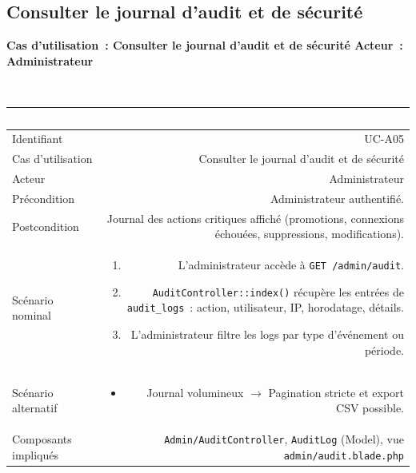 \documentclass[a4paper,12pt]{article}
\newcommand{\ucheader}[2]{%
  \noindent\colorbox{capblue}{\parbox{\dimexpr\linewidth-2\fboxsep}{%
    \color{white}\bfseries\large Cas d'utilisation~: #1 \hfill \normalsize Acteur~: #2
  }}\\[2pt]
}
\begin{document}
\vspace{1em}

\subsection{Consulter le journal d'audit et de sécurité}
\ucheader{Consulter le journal d'audit et de sécurité}{Administrateur}

\noindent
\begin{tabular}{|L|R|}
\hline
{}\textcolor{white}{\textbf{Champ}} & \textcolor{white}{\textbf{Description}} \\
\hline
{}Identifiant & UC-A05 \\
\hline
Cas d'utilisation & Consulter le journal d'audit et de sécurité \\
\hline
{}Acteur & Administrateur \\
\hline
Précondition & Administrateur authentifié. \\
\hline
{}Postcondition & Journal des actions critiques affiché (promotions, connexions échouées, suppressions, modifications). \\
\hline
Scénario nominal &
\begin{enumerate}
  \item L'administrateur accède à \texttt{GET /admin/audit}.
  \item \texttt{AuditController::index()} récupère les entrées de \texttt{audit\_logs}~: action, utilisateur, IP, horodatage, détails.
  \item L'administrateur filtre les logs par type d'événement ou période.
\end{enumerate} \\
\hline
{}Scénario alternatif &
\begin{itemize}
  \item Journal volumineux $\rightarrow$ Pagination stricte et export CSV possible.
\end{itemize} \\
\hline
Composants impliqués & \texttt{Admin/AuditController}, \texttt{AuditLog} (Model), vue \texttt{admin/audit.blade.php} \\
\hline
\end{tabular}

\vspace{1em}
\end{document}
